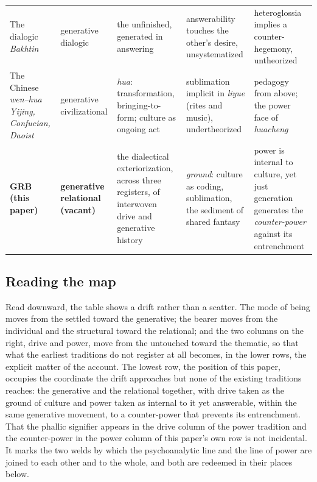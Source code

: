 \begin{center}
\begin{tabularx}{\linewidth}{@{}>{\RaggedRight\arraybackslash}p{2.5cm} >{\RaggedRight\arraybackslash}p{2.7cm} >{\RaggedRight\arraybackslash}X >{\RaggedRight\arraybackslash}p{2.5cm} >{\RaggedRight\arraybackslash}p{2.5cm}@{}}
The dialogic \newline\emph{\small Bakhtin} & generative \texttimes{} dialogic & the unfinished, generated in answering & answerability touches the other's desire, unsystematized & heteroglossia implies a counter-hegemony, untheorized \\
The Chinese \emph{wen--hua} \newline\emph{\small Yijing, Confucian, Daoist} & generative \texttimes{} civilizational & \emph{hua}: transformation, bringing-to-form; culture as ongoing act & sublimation implicit in \emph{liyue} (rites and music), undertheorized & pedagogy from above; the power face of \emph{huacheng} \\
\midrule
\textcolor{rosedeep}{\textbf{GRB (this paper)}} & \textbf{generative \texttimes{} relational (vacant)} & the dialectical exteriorization, across three registers, of interwoven drive and generative history & \emph{ground}: culture as coding, sublimation, the sediment of shared fantasy & power is internal to culture, yet just generation generates the \emph{counter-power} against its entrenchment \\
\bottomrule
\end{tabularx}
\end{center}

\subsection*{Reading the map}

Read downward, the table shows a drift rather than a scatter. The mode of being moves from the settled toward the generative; the bearer moves from the individual and the structural toward the relational; and the two columns on the right, drive and power, move from the untouched toward the thematic, so that what the earliest traditions do not register at all becomes, in the lower rows, the explicit matter of the account. The lowest row, the position of this paper, occupies the coordinate the drift approaches but none of the existing traditions reaches: the generative and the relational together, with drive taken as the ground of culture and power taken as internal to it yet answerable, within the same generative movement, to a counter-power that prevents its entrenchment. That the phallic signifier appears in the drive column of the power tradition and the counter-power in the power column of this paper's own row is not incidental. It marks the two welds by which the psychoanalytic line and the line of power are joined to each other and to the whole, and both are redeemed in their places below.

